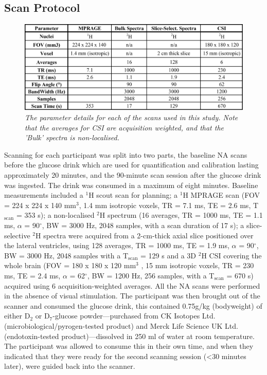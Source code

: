 \subsection{Scan Protocol}

\begin{figure}
    \centering
    \includegraphics[width = 1\textwidth]{Figures/Glucose/Scan_Details.png}
    \caption{\textit{The parameter details for each of the scans used in this study. Note that the averages for CSI are acquisition weighted, and that the 'Bulk' spectra is non-localised.}}
    \label{fig:Glu:Scan_Details}
\end{figure}

Scanning for each participant was split into two parts, the baseline \ac{NA} scans before the glucose drink which are used for quantification and calibration lasting approximately 20 minutes, and the 90-minute scan session after the glucose drink was ingested. The drink was consumed in a maximum of eight minutes. Baseline measurements included a $^1$H scout scan for planning; a $^1$H \ac{MPRAGE} scan (\ac{FOV} = 224 x 224 x 140 mm$^3$, 1.4 mm isotropic voxels, \ac{TR} = 7.1 ms, \ac{TE} = 2.6 ms, T$_\text{scan}$ = 353 s); a non-localised $^2$H spectrum (16 averages, \ac{TR} = 1000 ms, \ac{TE} = 1.1 ms, $\alpha$ = 90$^\circ$, \ac{BW} = 3000 Hz, 2048 samples, with a scan duration of 17 s); a slice-selective $^2$H spectra were acquired from a 2-cm-thick axial slice positioned over the lateral ventricles, using 128 averages, TR = 1000 ms, TE = 1.9 ms, $\alpha$ = 90$^\circ$, \ac{BW} = 3000 Hz,  2048 samples with a T$_\text{scan}$ = 129 s and a 3D $^2$H \ac{CSI} covering the whole brain (\ac{FOV} = 180 x 180 x 120 mm$^3$ , 15 mm isotropic voxels, \ac{TR} = 230 ms, \ac{TE} = 2.4 ms, $\alpha$ = 62$^\circ$, \ac{BW} = 1200 Hz, 256 samples, with a T$_\text{scan}$ = 670 s) acquired using 6 acquisition-weighted \cite{Pohmann2001AccurateCSI} averages. All the \ac{NA} scans were performed in the absence of visual stimulation. The participant was then brought out of the scanner and consumed the glucose drink, this contained 0.75g/kg (bodyweight) of either D$_2$ or D$_7$-glucose powder—purchased from CK Isotopes Ltd. (microbiological/pyrogen-tested product) and Merck Life Science UK Ltd. (endotoxin-tested product)—dissolved in 250 ml of water at room temperature. The participant was allowed to consume this in their own time, and when they indicated that they were ready for the second scanning session (<30 minutes later), were guided back into the scanner.


